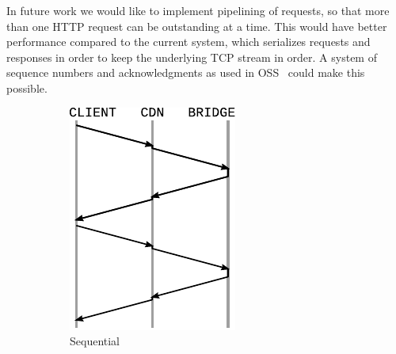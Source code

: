 \documentclass[conference]{IEEEtran}
\begin{document}
In future work we would like to implement pipelining of requests,
so that more than one HTTP request can be outstanding at a time.
This would have better performance compared to the current system,
which serializes requests and responses in order to keep the
underlying TCP stream in order.
A system of sequence numbers and acknowledgments as used in OSS~\cite{oss}
could make this possible.

\begin{figure}
\centering
\begin{subfigure}[t]{0.40\linewidth}
\includegraphics[width=\linewidth]{wire-sequential}
\caption{Sequential}
\label{fig:wire-sequential}
\end{subfigure}
\qquad
\begin{subfigure}[t]{0.40\linewidth}

\end{subfigure}
\end{figure}
\end{document}

